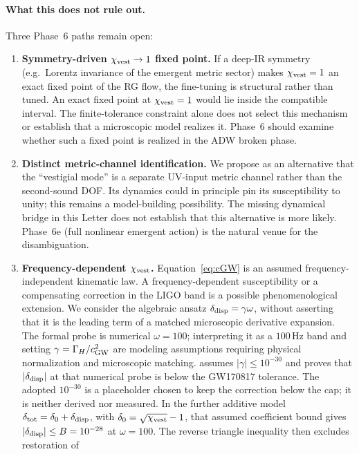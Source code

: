 \documentclass[aps,prl,reprint,nofootinbib,superscriptaddress]{revtex4-2}
\newcommand{\cGW}{c_{\rm GW}}
\newcommand{\chivest}{\chi_{\rm vest}}
\begin{document}
\paragraph{What this does not rule out.} Three Phase~6 paths remain
open:
\begin{enumerate}
\item \textbf{Symmetry-driven $\chivest \to 1$ fixed point.} If a
deep-IR symmetry (e.g.\ Lorentz invariance of the emergent metric
sector) makes $\chivest = 1$ an exact fixed point of the RG flow, the
fine-tuning is structural rather than tuned. An exact fixed point at $\chivest=1$ would lie inside the compatible
interval. The finite-tolerance constraint alone does not select this
mechanism or establish that a microscopic model realizes it.
Phase~6 should examine whether such a fixed point is realized in the
ADW broken phase.
\item \textbf{Distinct metric-channel identification.} We propose as an
alternative that the ``vestigial mode'' is a separate UV-input metric
channel rather than the second-sound DOF.
Its dynamics could in principle pin its susceptibility to unity;
this remains a model-building possibility. The missing dynamical
bridge in this Letter does not establish that this alternative is
more likely. Phase~6e (full nonlinear emergent action) is the natural
venue for the disambiguation.
\item \textbf{Frequency-dependent $\chivest$.} Equation~\eqref{eq:cGW} is
an assumed frequency-independent kinematic law.
A frequency-dependent susceptibility or a compensating correction
in the LIGO band is a possible phenomenological extension.
We consider the algebraic ansatz $\delta_{\rm disp}=\gamma\omega$,
without asserting that it is the leading term of a matched
microscopic derivative expansion.
The formal probe is numerical $\omega=100$; interpreting it as a
$100\,\mathrm{Hz}$ band and setting $\gamma=\Gamma_H/\cGW^2$ are
modeling assumptions requiring physical normalization and
microscopic matching.
assumes $|\gamma|\leq10^{-30}$ and proves that
$|\delta_{\rm disp}|$ at that numerical probe is below the
GW170817 tolerance.
The adopted $10^{-30}$ is a placeholder chosen to keep the
correction below the cap; it is neither derived nor measured.
In the further additive model
$\delta_{\rm tot}=\delta_0+\delta_{\rm disp}$, with
$\delta_0=\sqrt{\chivest}-1$, that assumed coefficient bound gives
$|\delta_{\rm disp}|\leq B=10^{-28}$ at $\omega=100$.
The reverse triangle inequality then excludes restoration of

\end{enumerate}
\end{document}
